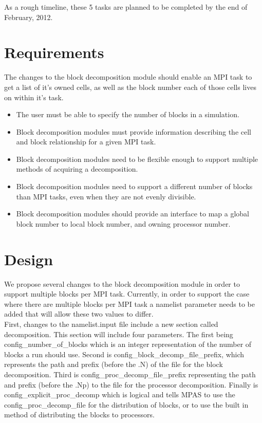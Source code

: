 \documentclass[11pt]{report}
\begin{document}
As a rough timeline, these 5 tasks are planned to be completed by the end of February, 2012.


%
%
\chapter{Requirements}

The changes to the block decomposition module should enable an MPI task to get
a list of it's owned cells, as well as the block number each of those cells
lives on within it's task.

\begin{itemize}

	\item The user must be able to specify the number of blocks in a
		simulation.

	\item Block decomposition modules must provide information describing the
		cell and block relationship for a given MPI task.

	\item Block decomposition modules need to be flexible enough to support
		multiple methods of acquiring a decomposition.

	\item Block decomposition modules need to support a different number of
		blocks than MPI tasks, even when they are not evenly divisible.

	\item Block decomposition modules should provide an interface to map a
		global block number to local block number, and owning processor number.
\end{itemize}

%
%
\chapter{Design}

We propose several changes to the block decomposition module in order to
support multiple blocks per MPI task. Currently, in order to support the case
where there are multiple blocks per MPI task a namelist parameter needs to be
added that will allow these two values to differ. \\

First, changes to the namelist.input file include a new section called
decomposition. This section will include four parameters. The first being
config\_number\_of\_blocks which is an integer representation of the number of
blocks a run should use. Second is config\_block\_decomp\_file\_prefix, which
represents the path and prefix (before the .N) of the file for the block
decomposition. Third is config\_proc\_decomp\_file\_prefix representing the
path and prefix (before the .Np) to the file for the processor decomposition.
Finally is config\_explicit\_proc\_decomp which is logical and tells MPAS to
use the config\_proc\_decomp\_file for the distribution of blocks, or to use
the built in method of distributing the blocks to processors.\\
\end{document}
